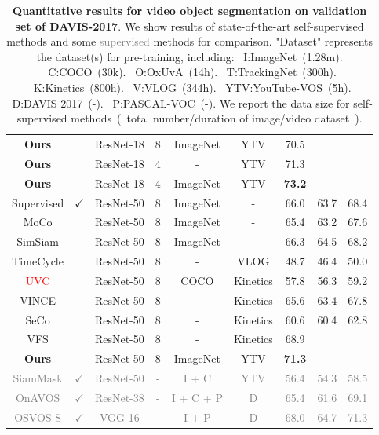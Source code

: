 \documentclass{article}
\begin{document}
\begin{table}[t]
{\begin{tabular}{ccccccccc}
      \textbf{Ours} & & ResNet-18 & 8 & ImageNet & YTV
			& 70.5   & & \\
      \textbf{Ours} & & ResNet-18 & 4 & - & YTV
			& 71.3    & & \\
      \textbf{Ours} & & ResNet-18 & 4 & ImageNet & YTV
			& \textbf{73.2}   & &  \\
			\hline
      \hline
      Supervised & $\checkmark$& ResNet-50 & 8 & ImageNet &-
			& 66.0 & 63.7  & 68.4  \\
      MoCo & & ResNet-50 & 8 & ImageNet &-
			& 65.4 & 63.2  & 67.6  \\
      SimSiam & & ResNet-50 & 8 & ImageNet &-
			& 66.3 & 64.5  & 68.2  \\
      TimeCycle & & ResNet-50 & 8 & - & VLOG
			& 48.7 & 46.4  & 50.0  \\
      \textcolor{red}{UVC}  & & ResNet-50 & 8 & COCO & Kinetics
			& 57.8 & 56.3  & 59.2  \\
      VINCE & & ResNet-50 & 8 & - & Kinetics
			& 65.6 & 63.4  & 67.8  \\
      SeCo & & ResNet-50 & 8 & - & Kinetics
			& 60.6 & 60.4  & 62.8  \\
      VFS  & & ResNet-50 & 8 & - & Kinetics
			& 68.9     \\
      \hline
      \textbf{Ours} & & ResNet-50 & 8 & ImageNet & YTV
			& \textbf{71.3}   & &  \\
      \hline
      \textcolor{gray}{SiamMask} & \textcolor{gray}{$\checkmark$} & \textcolor{gray}{ResNet-50} & \textcolor{gray}{-} & \textcolor{gray}{I + C} & \textcolor{gray}{YTV}
			& \textcolor{gray}{56.4} & \textcolor{gray}{54.3}  & \textcolor{gray}{58.5}  \\
      \textcolor{gray}{OnAVOS} & \textcolor{gray}{$\checkmark$} & \textcolor{gray}{ResNet-38} & \textcolor{gray}{-} & \textcolor{gray}{I + C + P} & \textcolor{gray}{D}
			& \textcolor{gray}{65.4} & \textcolor{gray}{61.6}  & \textcolor{gray}{69.1}  \\
      \textcolor{gray}{OSVOS-S}  & \textcolor{gray}{$\checkmark$} & \textcolor{gray}{VGG-16} & \textcolor{gray}{-} & \textcolor{gray}{I + P} & \textcolor{gray}{D}
			& \textcolor{gray}{68.0}   & \textcolor{gray}{64.7} & \textcolor{gray}{71.3}  \\
			\bottomrule
		\end{tabular}
	}
	\captionsetup{font=footnotesize}
	\caption{\textbf{Quantitative results for video object segmentation on validation set of DAVIS-2017}. We show results of state-of-the-art self-supervised methods and some \textcolor{gray}{supervised} methods for comparison. "Dataset" represents the dataset(s) for pre-training, including: ~I:ImageNet~(1.28m). ~C:COCO~(30k). ~O:OxUvA~(14h). ~T:TrackingNet~(300h). ~K:Kinetics~(800h). ~V:VLOG~(344h). ~YTV:YouTube-VOS~(5h). ~D:DAVIS 2017~(-). ~P:PASCAL-VOC~(-). We report the data size for self-supervised methods~(~total number/duration of image/video dataset~).}
	\label{table:sota}
	\vspace{-17pt}
\end{table}
\end{document}
